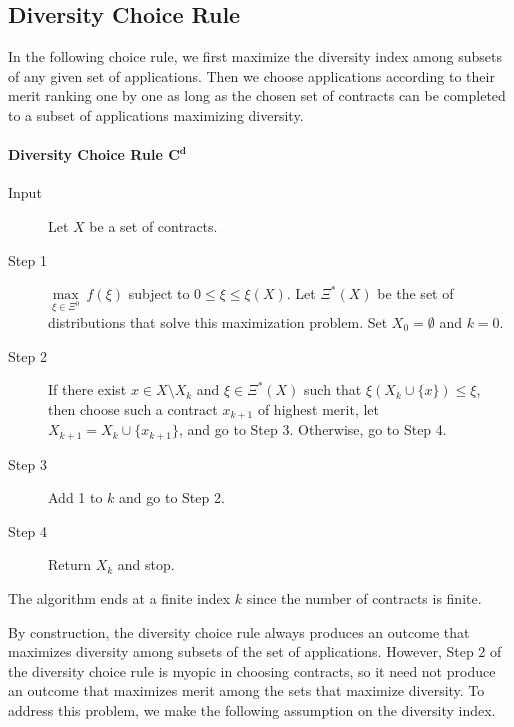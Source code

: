\documentclass[12pt]{amsart}
\theoremstyle{remark}
\begin{document}
\subsection{Diversity Choice Rule}\label{sec:choice}
In the following choice rule, we first maximize the diversity index among
subsets of any given set of applications. Then we choose applications according to their
merit ranking one by one as long as the chosen set of contracts can be completed
to a subset of applications maximizing diversity.


\medskip
\paragraph{\textbf{Diversity Choice Rule} $\mathbf{C^d}$}

\begin{description}
  \item[Input] Let $X$ be a set of contracts.
  \item[Step 1] $\underset {\xi\in \Xi^0} {\max} \: f(\xi)$ subject to $0 \leq \xi \leq \xi(X)$. Let $\Xi^*(X)$ be the set of distributions that solve this maximization problem. Set $X_0=\emptyset$ and $k=0$.
  \item[Step 2] If there exist $x \in X \setminus X_k$ and $\xi \in \Xi^*(X)$ such that $\xi(X_k \cup \{x\}) \leq \xi$, then choose such a contract
      $x_{k+1}$ of highest merit, let $X_{k+1}=X_k \cup \{x_{k+1}\}$, and go
      to Step 3. Otherwise, go to Step 4.
  \item[Step 3] Add 1 to $k$ and go to Step 2.
  \item[Step 4] Return $X_k$ and stop.
\end{description}

The algorithm ends at a finite index $k$ since the number of contracts is finite.

By construction, the diversity choice rule always produces an outcome that maximizes
diversity among subsets of the set of applications. However, Step 2 of the
diversity choice rule is myopic in choosing contracts, so
it need not produce an outcome that maximizes merit
among the sets that maximize diversity.
To address this problem, we make the following assumption on the diversity index.
\end{document}
